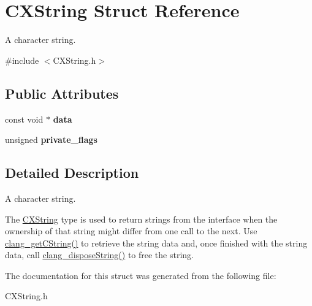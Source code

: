 \hypertarget{structCXString}{}\section{C\+X\+String Struct Reference}
\label{structCXString}


A character string.  




{\ttfamily \#include $<$C\+X\+String.\+h$>$}

\subsection*{Public Attributes}
\begin{DoxyCompactItemize}
\item 
\mbox{\label{structCXString_a22192d0215a9fc17b9859b0d59af9f00}} 
const void $\ast$ {\bfseries data}
\item 
\mbox{\label{structCXString_a079754f256fc9ae141ecb0d527e74930}} 
unsigned {\bfseries private\+\_\+flags}
\end{DoxyCompactItemize}


\subsection{Detailed Description}
A character string. 

The {\ttfamily \hyperlink{structCXString}{C\+X\+String}} type is used to return strings from the interface when the ownership of that string might differ from one call to the next. Use {\ttfamily \hyperlink{group__CINDEX__STRING_gafd043aa189e990b9e327e9f95a1da8a5}{clang\+\_\+get\+C\+String()}} to retrieve the string data and, once finished with the string data, call {\ttfamily \hyperlink{group__CINDEX__STRING_gaeff715b329ded18188959fab3066048f}{clang\+\_\+dispose\+String()}} to free the string. 

The documentation for this struct was generated from the following file\+:\begin{DoxyCompactItemize}
\item 
C\+X\+String.\+h\end{DoxyCompactItemize}

